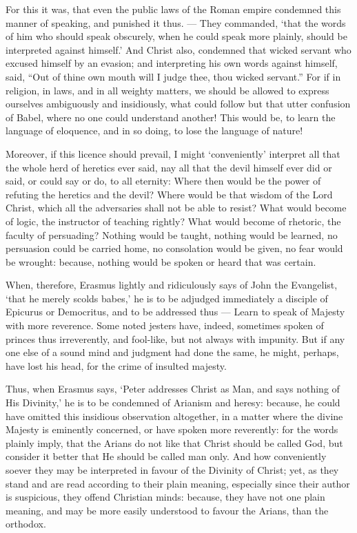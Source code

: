 For this it was, that even the public laws of the Roman empire condemned this manner of speaking, and punished it thus. — They commanded, ‘that the words of him who should speak obscurely, when he could speak more plainly, should be interpreted against himself.’ And Christ also, condemned that wicked servant who excused himself by an evasion; and interpreting his own words against himself, said, “Out of thine own mouth will I judge thee, thou wicked servant.” For if in religion, in laws, and in all weighty matters, we should be allowed to express ourselves ambiguously and insidiously, what could follow but that utter confusion of Babel, where no one could understand another! This would be, to learn the language of eloquence, and in so doing, to lose the language of nature!

Moreover, if this licence should prevail, I might ‘conveniently’ interpret all that the whole herd of heretics ever said, nay all that the devil himself ever did or said, or could say or do, to all eternity: Where then would be the power of refuting the heretics and the devil? Where would be that wisdom of the Lord Christ, which all the adversaries shall not be able to resist? What would become of logic, the instructor of teaching rightly? What would become of rhetoric, the faculty of persuading? Nothing would be taught, nothing would be learned, no persuasion could be carried home, no consolation would be given, no fear would be wrought: because, nothing would be spoken or heard that was certain.

When, therefore, Erasmus lightly and ridiculously says of John the Evangelist, ‘that he merely scolds babes,’ he is to be adjudged immediately a disciple of Epicurus or Democritus, and to be addressed thus — Learn to speak of Majesty with more reverence. Some noted jesters have, indeed, sometimes spoken of princes thus irreverently, and fool-like, but not always with impunity. But if any one else of a sound mind and judgment had done the same, he might, perhaps, have lost his head, for the crime of insulted majesty.

Thus, when Erasmus says, ‘Peter addresses Christ as Man, and says nothing of His Divinity,’ he is to be condemned of Arianism and heresy: because, he could have omitted this insidious observation altogether, in a matter where the divine Majesty is eminently concerned, or have spoken more reverently: for the words plainly imply, that the Arians do not like that Christ should be called God, but consider it better that He should be called man only. And how conveniently soever they may be interpreted in favour of the Divinity of Christ; yet, as they stand and are read according to their plain meaning, especially since their author is suspicious, they offend Christian minds: because, they have not one plain meaning, and may be more easily understood to favour the Arians, than the orthodox.


